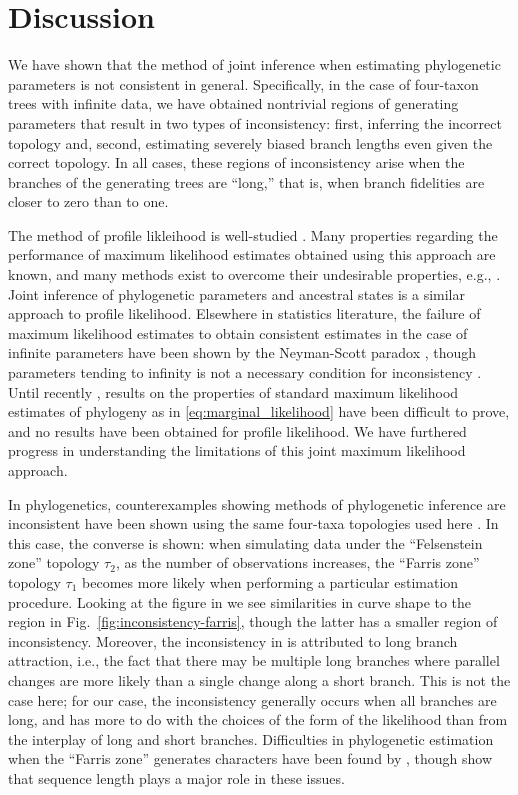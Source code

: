 \documentclass{article}
\begin{document}
\section*{Discussion}

We have shown that the method of joint inference when estimating phylogenetic parameters is not consistent in general.
Specifically, in the case of four-taxon trees with infinite data, we have obtained nontrivial regions of generating parameters that result in two types of inconsistency: first, inferring the incorrect topology and, second, estimating severely biased branch lengths even given the correct topology.
In all cases, these regions of inconsistency arise when the branches of the generating trees are ``long,'' that is, when branch fidelities are closer to zero than to one.

The method of profile likleihood is well-studied \cite{Murphy2000-ry}.
Many properties regarding the performance of maximum likelihood estimates obtained using this approach are known, and many methods exist to overcome their undesirable properties, e.g., \cite{Geman1982}.
Joint inference of phylogenetic parameters and ancestral states \cite{Sagulenko2017-jo} is a similar approach to profile likelihood.
Elsewhere in statistics literature, the failure of maximum likelihood estimates to obtain consistent estimates in the case of infinite parameters have been shown by the Neyman-Scott paradox \cite{Neyman1948-tt}, though parameters tending to infinity is not a necessary condition for inconsistency \cite{LeCam1990}.
Until recently \cite{RoyChoudhury2015-ta}, results on the properties of standard maximum likelihood estimates of phylogeny as in \eqref{eq:marginal_likelihood} have been difficult to prove, and no results have been obtained for profile likelihood.
We have furthered progress in understanding the limitations of this joint maximum likelihood approach.

In phylogenetics, counterexamples showing methods of phylogenetic inference are inconsistent have been shown using the same four-taxa topologies used here \cite{Felsenstein1978-rr}.
In this case, the converse is shown: when simulating data under the ``Felsenstein zone'' topology $\tau_2$, as the number of observations increases, the ``Farris zone'' topology $\tau_1$ becomes more likely when performing a particular estimation procedure.
Looking at the figure in \cite{Felsenstein1978-rr} we see similarities in curve shape to the region in Fig.~\ref{fig:inconsistency-farris}, though the latter has a smaller region of inconsistency.
Moreover, the inconsistency in \cite{Felsenstein1978-rr} is attributed to long branch attraction, i.e., the fact that there may be multiple long branches where parallel changes are more likely than a single change along a short branch.
This is not the case here; for our case, the inconsistency generally occurs when all branches are long, and has more to do with the choices of the form of the likelihood than from the interplay of long and short branches.
Difficulties in phylogenetic estimation when the ``Farris zone'' generates characters have been found by \cite{Siddall1998-hq}, though \cite{Swofford2001-hr} show that sequence length plays a major role in these issues.
\end{document}
